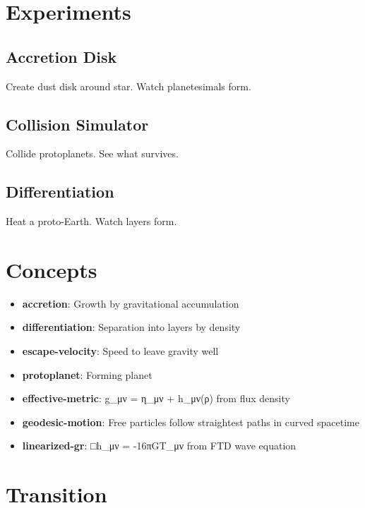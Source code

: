 \documentclass[
  11pt,
  letterpaper,
  twoside,
  openright]{book}
\providecommand{\tightlist}{%
  \setlength{\itemsep}{0pt}\setlength{\parskip}{0pt}}
\begin{document}
\section{Experiments}\label{experiments-15}

\subsection{Accretion Disk}\label{accretion-disk}

Create dust disk around star. Watch planetesimals form.

\subsection{Collision Simulator}\label{collision-simulator}

Collide protoplanets. See what survives.

\subsection{Differentiation}\label{differentiation-1}

Heat a proto-Earth. Watch layers form.

\section{Concepts}\label{concepts-15}

\begin{itemize}
\tightlist
\item
  \textbf{accretion}: Growth by gravitational accumulation
\item
  \textbf{differentiation}: Separation into layers by density
\item
  \textbf{escape-velocity}: Speed to leave gravity well
\item
  \textbf{protoplanet}: Forming planet
\item
  \textbf{effective-metric}: g\_μν = η\_μν + h\_μν(ρ) from flux density
\item
  \textbf{geodesic-motion}: Free particles follow straightest paths in
  curved spacetime
\item
  \textbf{linearized-gr}: □h\_μν = -16πGT\_μν from FTD wave equation
\end{itemize}

\section{Transition}\label{transition-15}
\end{document}
